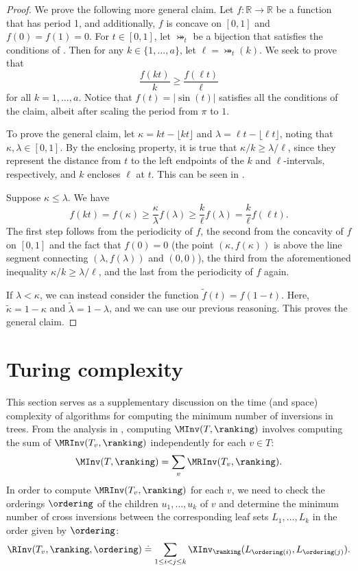 \documentclass{toc}
\begin{document}
\begin{proof}
    We prove the following more general claim. Let $f:\mathbb{R}\to\mathbb{R}$ be a function that has period 1, and additionally, $f$ is concave on $[0,1]$ and $f(0)=f(1)=0$. For $t\in [0,1]$, let $\bij_t$ be a bijection that satisfies the conditions of . Then for any $k\in \{1,\dots,a\}$, let $\ell=\bij_t(k)$. We seek to prove that 
    \[\frac{f(kt)}{k}\ge \frac{f(\ell t)}{\ell} \]
    for all $k=1,\dots,a$. Notice that $f(t)=\lvert\sin(t)\rvert$ satisfies all the conditions of the claim, albeit after scaling the period from $\pi$ to $1$.
    
    To prove the general claim, let $\kappa=kt-\lfloor kt\rfloor$ and $\lambda=\ell t-\lfloor \ell t\rfloor$, noting that $\kappa,\lambda\in [0,1]$. By the enclosing property, it is true that $\kappa/k \ge \lambda/\ell$, since they represent the distance from $t$ to the left endpoints of the $k$ and $\ell$-intervals, respectively, and $k$ encloses $\ell$ at $t$. This can be seen in .
    
    Suppose $\kappa\le \lambda$. We have 
    \[f(kt)=f(\kappa) \ge \frac{\kappa}{\lambda}f(\lambda)\ge \frac{k}{\ell}f(\lambda)=\frac{k}{\ell}f(\ell t). \]
    The first step follows from the periodicity of $f$, the second from the concavity of $f$ on $[0,1]$ and the fact that $f(0)=0$ (the point $(\kappa,f(\kappa))$ is above the line segment connecting $(\lambda,f(\lambda))$ and $(0,0)$), the third from the aforementioned inequality $\kappa/k \ge \lambda/\ell$, and the last from the periodicity of $f$ again. 
    
    If $\lambda<\kappa$, we can instead consider the function $\widetilde{f}(t)=f(1-t)$. Here, $\widetilde{\kappa}=1-\kappa$ and $\widetilde{\lambda}=1-\lambda$, and we can use our previous reasoning. This proves the general claim.
\end{proof}



\section{Turing complexity}
\label{sec:turing}

This section serves as a supplementary discussion on the time (and space) complexity of algorithms for computing the minimum number of inversions in trees. From the analysis in , computing $\MInv(T,\ranking)$ involves computing the sum of $\MRInv(T_v,\ranking)$ independently for each $v\in T$:
\begin{equation*}
   \MInv(T,\ranking) = \sum_v \MRInv(T_v,\ranking).
\end{equation*}
In order to compute $\MRInv(T_v,\ranking)$ for each $v$, we need to check the orderings $\ordering$ of the children $u_1, \dots, u_k$ of $v$ and determine the minimum number of cross inversions between the corresponding leaf sets $L_1,\dots,L_k$ in the order given by $\ordering$:
\begin{equation*}
    \RInv(T_v,\ranking,\ordering) \doteq \sum_{1 \le i < j \le k} \XInv_\ranking(L_{\ordering(i)},L_{\ordering(j)}).
\end{equation*}
\end{document}

